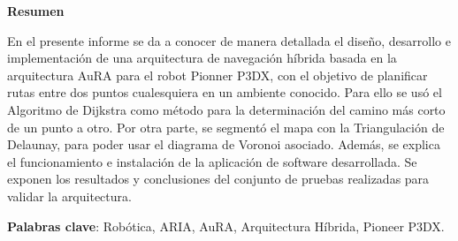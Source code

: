 \documentclass[11pt,twoside,A5]{article}
\begin{document}
\maketitle 
\fancyhead{} 
\fancyfoot{}
\fancyfoot[RO,LE]{\thepage}

\begin{center}
{\bf\small Resumen}

\vspace{-3mm} \hspace{.05in}\parbox{4.5in} {{\small %

En el presente informe se da a conocer de manera detallada el diseño, desarrollo e implementación de 
una arquitectura de navegación híbrida basada en la arquitectura AuRA para el robot Pionner P3DX, 
con el objetivo de planificar rutas entre dos puntos cualesquiera 
en un ambiente conocido.
Para ello se usó el Algoritmo de Dijkstra como método para la determinación del camino más corto de un punto a otro.
Por otra parte, se segmentó el mapa con la Triangulación de Delaunay, para poder usar el diagrama de Voronoi asociado.
Además, se explica el funcionamiento e instalación de la aplicación de software 
desarrollada. Se exponen los resultados y conclusiones del conjunto de pruebas 
realizadas para validar la arquitectura.

 \textbf{Palabras clave}: Robótica, ARIA, AuRA, Arquitectura Híbrida, Pioneer P3DX.}}
\end{center}
\pagebreak


%
%
%
\end{document}
